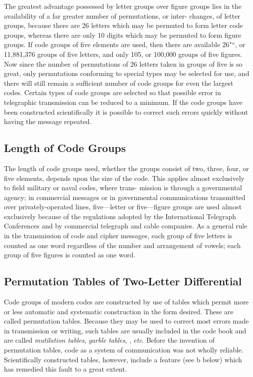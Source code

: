 \mypara The greatest advantage possessed by letter groups over ﬁgure groups
lies in the availability of a far greater number of permutations, or inter-
changes, of letter groups, because there are 26 letters which may be
permuted to form letter code groups, whereas there are only 10 digits
which may be permuted to form ﬁgure groups. If code groups of ﬁve
elements are used, then there are available 26"“, or 11,881,376 groups of
ﬁve letters, and only 105, or 100,000 groups of ﬁve ﬁgures. Now since
the number of permutations of 26 letters taken in groups of ﬁve is so
great, only permutations conforming to special types may be selected for
use, and there will still remain a sufﬁcient number of code groups for
even the largest codes. Certain types of code groups are selected so that
possible error in telegraphic transmission can be reduced to a minimum.
If the code groups have been constructed scientiﬁcally it is possible to
correct such errors quickly without having the message repeated.

\subsection{Length of Code Groups}

The length of code groups used, whether the groups consist of two,
three, four, or ﬁve elements, depends upon the size of the code. This
applies almost exclusively to ﬁeld military or naval codes, where trans-
mission is through a governmental agency; in commercial messages or
in governmental communications transmitted over privately-operated
lines, ﬁve—letter or ﬁve—ﬁgure groups are used almost exclusively because
of the regulations adopted by the International Telegraph Conferences
and by commercial telegraph and cable companies. As a general rule in
the transmission of code and cipher messages, each group of ﬁve letters
is counted as one word regardless of the number and arrangement of
vowels; each group of ﬁve ﬁgures is counted as one word.

\subsection{Permutation Tables of Two-Letter Differential}

\mypara Code groups of modern codes are constructed by use of tables which
permit more or less automatic and systematic construction in the form
desired. These are called permutation tables. Because they may be used
to correct most errors made in transmission or writing, such tables are
usually included in the code book and are called \textit{mutilation tables}, \textit{garble
tables}, , \textit{etc}. Before the invention of permutation
tables, code as a system of communication was not wholly reliable. Scientiﬁcally constructed tables, however, include a feature (see b below)
which has remedied this fault to a great extent.

